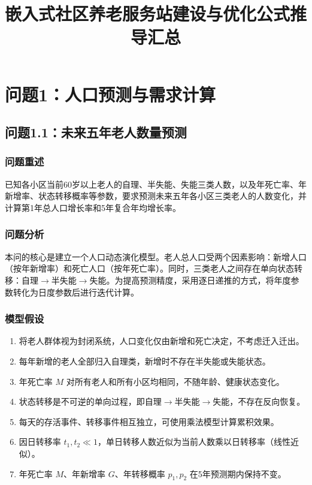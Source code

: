 \documentclass[12pt,a4paper]{article}
\title{嵌入式社区养老服务站建设与优化\quad 公式推导汇总}
\date{}
\begin{document}
\maketitle

\section{问题1：人口预测与需求计算}

\subsection{问题1.1：未来五年老人数量预测}

\subsubsection{问题重述}
已知各小区当前60岁以上老人的自理、半失能、失能三类人数，以及年死亡率、年新增率、状态转移概率等参数，要求预测未来五年各小区三类老人的人数变化，并计算第1年总人口增长率和5年复合年均增长率。

\subsubsection{问题分析}
本问的核心是建立一个人口动态演化模型。老人总人口受两个因素影响：新增人口（按年新增率）和死亡人口（按年死亡率）。同时，三类老人之间存在单向状态转移：自理$\to$半失能$\to$失能。为提高预测精度，采用逐日递推的方式，将年度参数转化为日度参数后进行迭代计算。

\subsubsection{模型假设}
\begin{enumerate}
    \item 将老人群体视为封闭系统，人口变化仅由新增和死亡决定，不考虑迁入迁出。
    \item 每年新增的老人全部归入自理类，新增时不存在半失能或失能状态。
    \item 年死亡率 $M$ 对所有老人和所有小区均相同，不随年龄、健康状态变化。
    \item 状态转移是不可逆的单向过程，即自理$\to$半失能$\to$失能，不存在反向恢复。
    \item 每天的存活事件、转移事件相互独立，可使用乘法模型计算累积效果。
    \item 因日转移率 $t_1, t_2 \ll 1$，单日转移人数近似为当前人数乘以日转移率（线性近似）。
    \item 年死亡率 $M$、年新增率 $G$、年转移概率 $p_1, p_2$ 在5年预测期内保持不变。
\end{enumerate}
\end{document}
